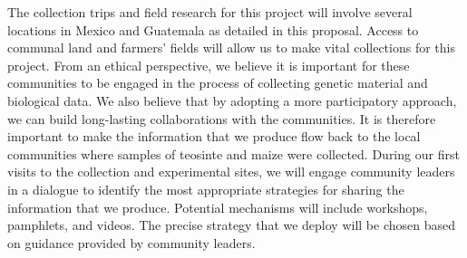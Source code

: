 The collection trips and field research for this project will involve several locations in Mexico and Guatemala as detailed in this proposal.
Access to communal land and farmers' fields will allow us to make vital collections for this project.
From an ethical perspective, we believe it is important for these communities to be engaged in the process of collecting genetic material and biological data.
We also believe that by adopting a more participatory approach, we can build long-lasting collaborations with the communities.
It is therefore important to make the information that we produce flow back to the local communities where samples of teosinte and maize were collected.
During our first visits to the collection and experimental sites, we will engage community leaders in a dialogue to identify the most appropriate strategies for sharing the information that we produce.  Potential mechanisms will include workshops, pamphlets, and videos.  The precise strategy that we deploy will be chosen based on guidance provided by community leaders.


 




